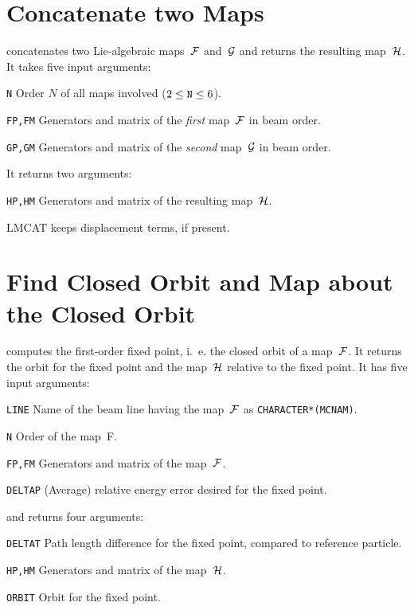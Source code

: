 \section{Concatenate two Maps}
\label{LMCAT}
concatenates two Lie-algebraic maps~$\cal F$ and~$\cal G$ and returns
the resulting map~$\cal H$.
It takes five input arguments:
\begin{mylist}
\item[\tt N]
Order $N$ of all maps involved ($2 \le \hbox{\tt N} \le 6$).
\item[\tt FP,FM]
Generators and matrix of the {\em first} map~$\cal F$ in beam
order.
\item[\tt GP,GM]
Generators and matrix of the {\em second} map~$\cal G$ in beam
order.
\end{mylist}
It returns two arguments:
\begin{mylist}
\item[\tt HP,HM] 
Generators and matrix of the resulting map~$\cal H$.
\end{mylist}
LMCAT keeps displacement terms, if present.
 
\section{Find Closed Orbit and Map about the Closed Orbit}
\label{LMCLOR}
computes the first-order fixed point, i.~e. the closed orbit of a
map~$\cal F$.
It returns the orbit for the fixed point and the map~$\cal H$ relative
to the fixed point.
It has five input arguments:
\begin{mylist}
\item[\tt LINE]
Name of the beam line having the map~$\cal F$ as
{\tt CHARACTER*(MCNAM)}.
\item[\tt N]
Order of the map~{\cal F}.
\item[\tt FP,FM]
Generators  and matrix  of the map~$\cal F$.
\item[\tt DELTAP]
(Average) relative energy error desired for the fixed point.
\end{mylist}
and returns four arguments:
\begin{mylist}
\item[\tt DELTAT]
Path length difference for the fixed point,
compared to reference particle.
\item[\tt HP,HM]
Generators  and matrix  of the map~$\cal H$.
\item[\tt ORBIT]
Orbit for the fixed point.
\end{mylist}
 
